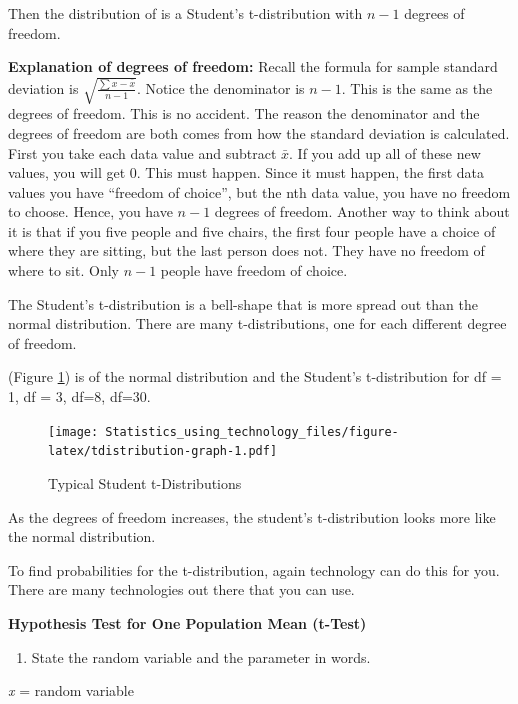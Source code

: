 \documentclass[]{book}
\providecommand{\tightlist}{%
  \setlength{\itemsep}{0pt}\setlength{\parskip}{0pt}}
\begin{document}
Then the distribution of is a Student's t-distribution with \(n-1\) degrees of freedom.

\textbf{Explanation of degrees of freedom:} Recall the formula for sample standard deviation is \(\sqrt{{\frac{\sum{x-\bar{x}}}{n-1}}}\). Notice the denominator is \(n-1\). This is the same as the degrees of freedom. This is no accident. The reason the denominator and the degrees of freedom are both comes from how the standard deviation is calculated. First you take each data value and subtract \(\bar{x}\). If you add up all of these new values, you will get 0. This must happen. Since it must happen, the first data values you have ``freedom of choice'', but the nth data value, you have no freedom to choose. Hence, you have \(n-1\) degrees of freedom. Another way to think about it is that if you five people and five chairs, the first four people have a choice of where they are sitting, but the last person does not. They have no freedom of where to sit. Only \(n-1\) people have freedom of
choice.

The Student's t-distribution is a bell-shape that is more spread out than the normal distribution. There are many t-distributions, one for each different degree of freedom.

(Figure \ref{fig:tdistribution-graph}) is of the normal distribution and the Student's
t-distribution for df = 1, df = 3, df=8, df=30.



\begin{figure}
\centering
\texttt{[image: Statistics\_using\_technology\_files/figure-latex/tdistribution-graph-1.pdf]}
\caption{\label{fig:tdistribution-graph}Typical Student t-Distributions}
\end{figure}

As the degrees of freedom increases, the student's t-distribution looks
more like the normal distribution.

To find probabilities for the t-distribution, again technology can do
this for you. There are many technologies out there that you can use.

\textbf{Hypothesis Test for One Population Mean (t-Test)}

\begin{enumerate}
\def\labelenumi{\arabic{enumi}.}
\tightlist
\item
  State the random variable and the parameter in words.
\end{enumerate}

\emph{x} = random variable
\end{document}
